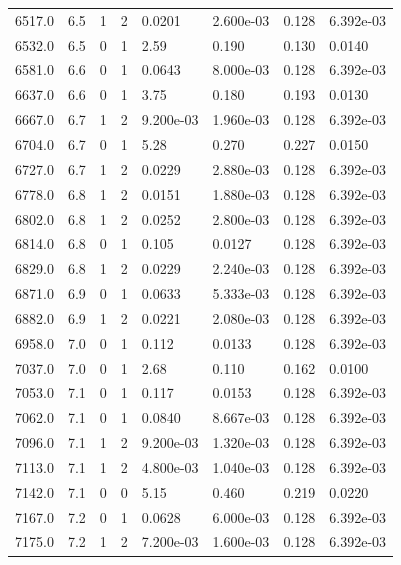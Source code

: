 \documentclass[preview]{standalone}
\begin{document}
{{{{{{{{\begin{tabular}{L{1.2cm}C{1.2cm} C{0.3cm}C{0.5cm} C{1.4cm}C{1.4cm} C{1.4cm}C{1.4cm}}
  6517.0  &   6.5  & 1     &  2 &  0.0201  & 2.600e-03  & 0.128 &  6.392e-03   \\ 
  6532.0  &   6.5  & 0     &  1 &  2.59  & 0.190  & 0.130 &  0.0140   \\ 
  6581.0  &   6.6  & 0     &  1 &  0.0643  & 8.000e-03  & 0.128 &  6.392e-03   \\ 
  6637.0  &   6.6  & 0     &  1 &  3.75  & 0.180  & 0.193 &  0.0130   \\ 
  6667.0  &   6.7  & 1     &  2 &  9.200e-03  & 1.960e-03  & 0.128 &  6.392e-03   \\ 
  6704.0  &   6.7  & 0     &  1 &  5.28  & 0.270  & 0.227 &  0.0150   \\ 
  6727.0  &   6.7  & 1     &  2 &  0.0229  & 2.880e-03  & 0.128 &  6.392e-03   \\ 
  6778.0  &   6.8  & 1     &  2 &  0.0151  & 1.880e-03  & 0.128 &  6.392e-03   \\ 
  6802.0  &   6.8  & 1     &  2 &  0.0252  & 2.800e-03  & 0.128 &  6.392e-03   \\ 
  6814.0  &   6.8  & 0     &  1 &  0.105  & 0.0127  & 0.128 &  6.392e-03   \\ 
  6829.0  &   6.8  & 1     &  2 &  0.0229  & 2.240e-03  & 0.128 &  6.392e-03   \\ 
  6871.0  &   6.9  & 0     &  1 &  0.0633  & 5.333e-03  & 0.128 &  6.392e-03   \\ 
  6882.0  &   6.9  & 1     &  2 &  0.0221  & 2.080e-03  & 0.128 &  6.392e-03   \\ 
  6958.0  &   7.0  & 0     &  1 &  0.112  & 0.0133  & 0.128 &  6.392e-03   \\ 
  7037.0  &   7.0  & 0     &  1 &  2.68  & 0.110  & 0.162 &  0.0100   \\ 
  7053.0  &   7.1  & 0     &  1 &  0.117  & 0.0153  & 0.128 &  6.392e-03   \\ 
  7062.0  &   7.1  & 0     &  1 &  0.0840  & 8.667e-03  & 0.128 &  6.392e-03   \\ 
  7096.0  &   7.1  & 1     &  2 &  9.200e-03  & 1.320e-03  & 0.128 &  6.392e-03   \\ 
  7113.0  &   7.1  & 1     &  2 &  4.800e-03  & 1.040e-03  & 0.128 &  6.392e-03   \\ 
  7142.0  &   7.1  & 0     &  0 &  5.15  & 0.460  & 0.219 &  0.0220   \\ 
  7167.0  &   7.2  & 0     &  1 &  0.0628  & 6.000e-03  & 0.128 &  6.392e-03   \\ 
  7175.0  &   7.2  & 1     &  2 &  7.200e-03  & 1.600e-03  & 0.128 &  6.392e-03   \\ 

\end{tabular}}}}}}}}}
\end{document}
